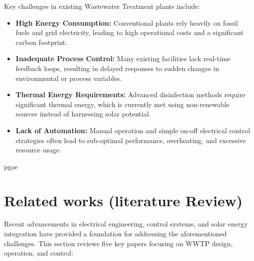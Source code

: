 \documentclass[12pt,a4paper]{report}
\begin{document}
Key challenges in existing Wastewater Treatment plants include:
\begin{itemize}
    \item \textbf{High Energy Consumption:} Conventional plants rely heavily on fossil fuels and grid electricity, leading to high operational costs and a significant carbon footprint.
    \item \textbf{Inadequate Process Control:} Many existing facilities lack real-time feedback loops, resulting in delayed responses to sudden changes in environmental or process variables.
    \item \textbf{Thermal Energy Requirements:} Advanced disinfection methods require significant thermal energy, which is currently met using non-renewable sources instead of harnessing solar potential.
    \item \textbf{Lack of Automation:} Manual operation and simple on-off electrical control strategies often lead to sub-optimal performance, overheating, and excessive resource usage.
\end{itemize}pgae 

\section{Related works (literature Review)}
Recent advancements in electrical engineering, control systems, and solar energy integration have provided a foundation for addressing the aforementioned challenges. This section reviews five key papers focusing on WWTP design, operation, and control:
\end{document}
